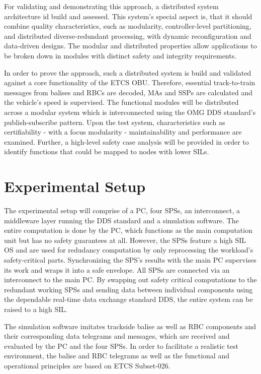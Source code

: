 \documentclass[a4paper, 12pt]{scrartcl}
\begin{document}
For validating and demonstrating this approach, a distributed system architecture id build and assessed.
This system's special aspect is, that it should combine quality characteristics, such as modularity, control\-ler-level partitioning, and distributed diverse-redundant processing, with dynamic reconfiguration and data-driven designs.
The modular and distributed properties allow applications to be broken down in modules with distinct safety and integrity requirements.

In order to prove the approach, such a distributed system is build and validated against a core functionality of the \ac{ETCS OBU}.
Therefore, essential track-to-train messages from balises and \acp{RBC} are decoded, \acp{MA} and \acp{SSP} are calculated and the vehicle's speed is supervised.
The functional modules will be distributed across a modular system which is interconnected using the \ac{OMG} \ac{DDS} standard's publish-subscribe pattern.
Upon the test system, characteristics such as certifiability - with a focus modularity - maintainability and performance are examined.
Further, a high-level safety case analysis will be provided in order to identify functions that could be mapped to nodes with lower \acp{SIL}.

\section*{Experimental Setup}
The experimental setup will comprise of a PC, four \acp{SPS}, an interconnect, a middleware layer running the \ac{DDS} standard and a simulation software.
The entire computation is done by the PC, which functions as the main computation unit but has no safety guarantees at all.
However, the \acp{SPS} feature a high \ac{SIL} \ac{OS} and are used for redudancy computation by only reprocessing the workload's safety-critical parts.
Synchronizing the \ac{SPS}'s results with the main PC supervises its work and wraps it into a safe envelope.
All \acp{SPS} are connected via an interconnect to the main PC.
By swapping out safety critical computations to the redundant working \acp{SPS} and sending data between individual components using the dependable real-time data exchange standard \ac{DDS}, the entire system can be raised to a high \ac{SIL}.

The simulation software imitates trackside balise as well as \ac{RBC} components and their corresponding data telegrams and messages, which are received and evaluated by the PC and the four \acp{SPS}.
In order to facilitate a realistic test environment, the balise and \ac{RBC} telegrams as well as the functional and operational principles are based on \ac{ETCS} Subset-026.
\end{document}
